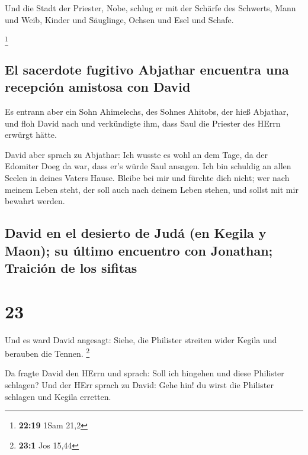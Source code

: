  Und die Stadt der Priester, Nobe, schlug er mit der
Schärfe des Schwerts, Mann und Weib, Kinder und Säuglinge, Ochsen und
Esel und Schafe.

\footnote{\textbf{22:19} 1Sam 21,2}

\hypertarget{el-sacerdote-fugitivo-abjathar-encuentra-una-recepciuxf3n-amistosa-con-david}{%
\subsection{El sacerdote fugitivo Abjathar encuentra una recepción
amistosa con
David}\label{el-sacerdote-fugitivo-abjathar-encuentra-una-recepciuxf3n-amistosa-con-david}}

 Es entrann aber ein Sohn Ahimelechs, des Sohnes Ahitobs,
der hieß Abjathar, und floh David nach  und verkündigte
ihm, dass Saul die Priester des HErrn erwürgt hätte.

 David aber sprach zu Abjathar: Ich wusste es wohl an dem
Tage, da der Edomiter Doeg da war, dass er's würde Saul ansagen. Ich bin
schuldig an allen Seelen in deines Vaters Hause.  Bleibe
bei mir und fürchte dich nicht; wer nach meinem Leben steht, der soll
auch nach deinem Leben stehen, und sollst mit mir bewahrt werden.

\hypertarget{david-en-el-desierto-de-juduxe1-en-kegila-y-maon-su-uxfaltimo-encuentro-con-jonathan-traiciuxf3n-de-los-sifitas}{%
\subsection{David en el desierto de Judá (en Kegila y Maon); su último
encuentro con Jonathan; Traición de los
sifitas}\label{david-en-el-desierto-de-juduxe1-en-kegila-y-maon-su-uxfaltimo-encuentro-con-jonathan-traiciuxf3n-de-los-sifitas}}

\hypertarget{section-22}{%
\section{23}\label{section-22}}

 Und es ward David angesagt: Siehe, die Philister streiten
wider Kegila und berauben die Tennen. \footnote{\textbf{23:1} Jos 15,44}

 Da fragte David den HErrn und sprach: Soll ich hingehen
und diese Philister schlagen? Und der HErr sprach zu David: Gehe hin! du
wirst die Philister schlagen und Kegila erretten.

